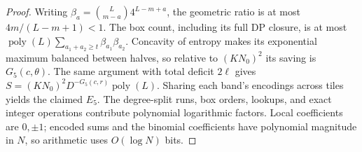 \documentclass[11pt]{article}
\begin{document}
\begin{proof}
Writing $\beta_a=\binom L{m-a}4^{L-m+a}$, the geometric ratio is at most
$4m/(L-m+1)<1$. The box count, including its full DP closure, is at most
$\operatorname{poly}(L)\sum_{a_1+a_2\ge t}\beta_{a_1}\beta_{a_2}$.
Concavity of entropy makes its exponential maximum balanced between halves,
so relative to $(KN_0)^2$ its saving is $G_5(c,\theta)$.
The same argument with total deficit $2\ell$ gives
$S=(KN_0)^2D^{-G_5(c,r)}\operatorname{poly}(L)$.
Sharing each band's encodings across tiles yields the claimed $E_5$.
The degree-split runs, box orders, lookups, and exact integer operations
contribute polynomial logarithmic factors. Local coefficients are $0,\pm1$;
encoded sums and the binomial coefficients have polynomial magnitude in
$N$, so arithmetic uses $O(\log N)$ bits.
\end{proof}
\end{document}
